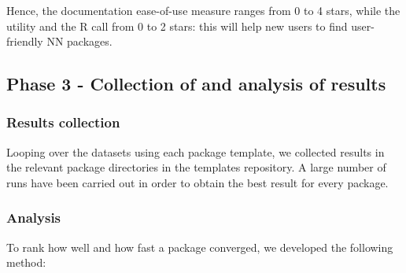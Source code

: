 Hence, the documentation ease-of-use measure ranges from 0 to 4 stars,
while the utility and the R call from 0 to 2 stars: this will help new
users to find user-friendly NN packages.

\hypertarget{phase-3---collection-of-and-analysis-of-results}{%
\subsection{Phase 3 - Collection of and analysis of
results}\label{phase-3---collection-of-and-analysis-of-results}}

\hypertarget{results-collection}{%
\subsubsection{Results collection}\label{results-collection}}

Looping over the datasets using each package template, we collected
results in the relevant package directories in the templates repository.
A large number of runs have been carried out in order to obtain the best
result for every package.

\hypertarget{analysis}{%
\subsubsection{Analysis}\label{analysis}}

To rank how well and how fast a package converged, we developed the
following method:

